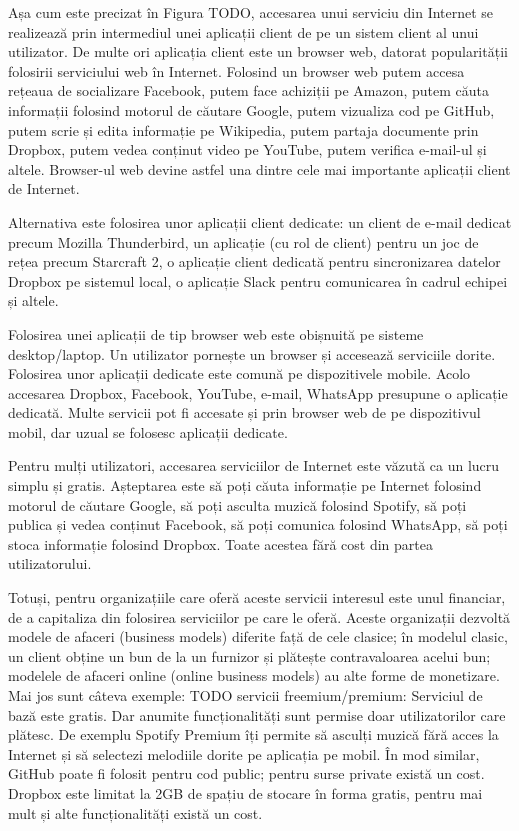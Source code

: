 Așa cum este precizat în Figura TODO, accesarea unui serviciu din Internet se realizează prin intermediul unei aplicații client de pe un sistem client al unui utilizator. De multe ori aplicația client este un browser web, datorat popularității folosirii serviciului web în Internet. Folosind un browser web putem accesa rețeaua de socializare Facebook, putem face achiziții pe Amazon, putem căuta informații folosind motorul de căutare Google, putem vizualiza cod pe GitHub, putem scrie și edita informație pe Wikipedia, putem partaja documente prin Dropbox, putem vedea conținut video pe YouTube, putem verifica e-mail-ul și altele. Browser-ul web devine astfel una dintre cele mai importante aplicații client de Internet.

Alternativa este folosirea unor aplicații client dedicate: un client de e-mail dedicat precum Mozilla Thunderbird, un aplicație (cu rol de client) pentru un joc de rețea precum Starcraft 2, o aplicație client dedicată pentru sincronizarea datelor Dropbox pe sistemul local, o aplicație Slack pentru comunicarea în cadrul echipei și altele.

Folosirea unei aplicații de tip browser web este obișnuită pe sisteme desktop/laptop. Un utilizator pornește un browser și accesează serviciile dorite. Folosirea unor aplicații dedicate este comună pe dispozitivele mobile. Acolo accesarea Dropbox, Facebook, YouTube, e-mail, WhatsApp presupune o aplicație dedicată. Multe servicii pot fi accesate și prin browser web de pe dispozitivul mobil, dar uzual se folosesc aplicații dedicate.

Pentru mulți utilizatori, accesarea serviciilor de Internet este văzută ca un lucru simplu și gratis. Așteptarea este să poți căuta informație pe Internet folosind motorul de căutare Google, să poți asculta muzică folosind Spotify, să poți publica și vedea conținut Facebook, să poți comunica folosind WhatsApp, să poți stoca informație folosind Dropbox. Toate acestea fără cost din partea utilizatorului.

Totuși, pentru organizațiile care oferă aceste servicii interesul este unul financiar, de a capitaliza din folosirea serviciilor pe care le oferă. Aceste organizații dezvoltă modele de afaceri (business models) diferite față de cele clasice; în modelul clasic, un client obține un bun de la un furnizor și plătește contravaloarea acelui bun; modelele de afaceri online (online business models) au alte forme de monetizare. Mai jos sunt câteva exemple: TODO servicii freemium/premium: Serviciul de bază este gratis. Dar anumite funcționalități sunt permise doar utilizatorilor care plătesc. De exemplu Spotify Premium îți permite să asculți muzică fără acces la Internet și să selectezi melodiile dorite pe aplicația pe mobil. În mod similar, GitHub poate fi folosit pentru cod public; pentru surse private există un cost. Dropbox este limitat la 2GB de spațiu de stocare în forma gratis, pentru mai mult și alte funcționalități există un cost.

